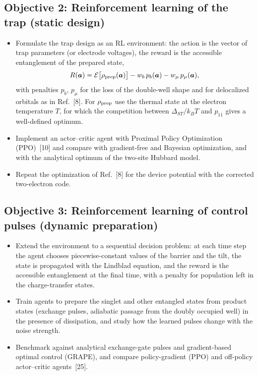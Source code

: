 \documentclass[12pt,a4paper]{article}
\begin{document}
\subsection*{Objective 2: Reinforcement learning of the trap (static design)}
\begin{itemize}
  \item Formulate the trap design as an RL environment: the action is
  the vector of trap parameters (or electrode voltages), the reward is
  the accessible entanglement of the prepared state,
  \[
     R(\boldsymbol a)=\mathcal E\bigl[\rho_{\rm prep}(\boldsymbol a)\bigr]
     -w_b\,p_b(\boldsymbol a)-w_\mu\,p_\mu(\boldsymbol a),
  \]
  with penalties $p_b$, $p_\mu$ for the loss of the double-well shape
  and for delocalized orbitals as in Ref.~[8].  For
  $\rho_{\rm prep}$ use the thermal state at the electron temperature
  $T$, for which the competition between $\Delta_{ST}/k_BT$ and
  $p_{11}$ gives a well-defined optimum.
  \item Implement an actor--critic agent with Proximal Policy
  Optimization (PPO)~[10] and compare with gradient-free and
  Bayesian optimization, and with the analytical optimum of the
  two-site Hubbard model.
  \item Repeat the optimization of Ref.~[8] for the device potential
  with the corrected two-electron code.
\end{itemize}

\subsection*{Objective 3: Reinforcement learning of control pulses (dynamic preparation)}
\begin{itemize}
  \item Extend the environment to a sequential decision problem: at
  each time step the agent chooses piecewise-constant values of the
  barrier and the tilt, the state is propagated with the Lindblad
  equation, and the reward is the accessible entanglement at the final
  time, with a penalty for population left in the charge-transfer
  states.
  \item Train agents to prepare the singlet and other entangled states
  from product states (exchange pulses, adiabatic passage from the
  doubly occupied well) in the presence of dissipation, and study how
  the learned pulses change with the noise strength.
  \item Benchmark against analytical exchange-gate pulses and
  gradient-based optimal control (GRAPE), and compare policy-gradient
  (PPO) and off-policy actor--critic agents~[25].
\end{itemize}
\end{document}
